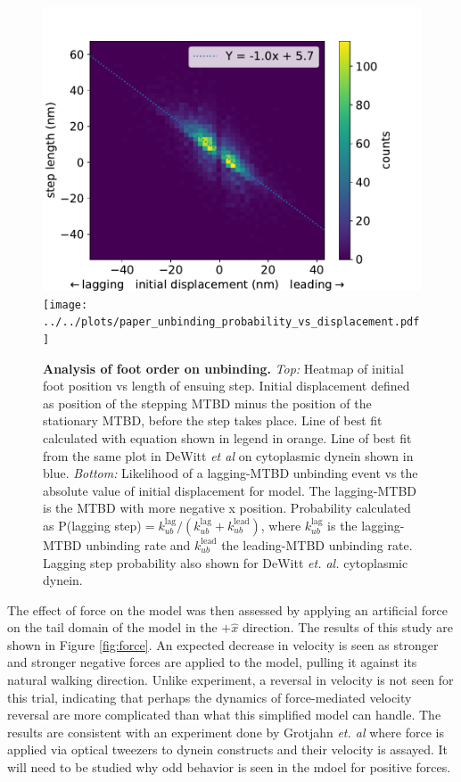 \documentclass[9pt,twocolumn,twoside]{article}
\begin{document}
\begin{figure}[tbhp]
  \includegraphics[width=\linewidth]{../../plots/paper_displacement_vs_step_length.pdf}
  \texttt{[image: ../../plots/paper\_unbinding\_probability\_vs\_displacement.pdf]}
  \caption{\textbf{Analysis of foot order on unbinding.} \textit{Top: } Heatmap of initial foot position vs length of ensuing step. Initial displacement defined as position of the stepping MTBD minus the position of the stationary MTBD, before the step takes place. Line of best fit calculated with equation shown in legend in orange. Line of best fit from the same plot in DeWitt \textit{et al} \cite{yildizpaper} on cytoplasmic dynein shown in blue. \textit{Bottom: } Likelihood of a lagging-MTBD unbinding event vs the absolute value of initial displacement for model. The lagging-MTBD is the MTBD with more negative x position. Probability calculated as P(lagging step)$ = k_{ub}^{\text{lag}} / \left(k_{ub}^{\text{lag}} + k_{ub}^{\text{lead}}\right)$, where $k_{ub}^{\text{lag}}$ is the lagging-MTBD unbinding rate and $k_{ub}^{\text{lead}}$ the leading-MTBD unbinding rate. Lagging step probability also shown for DeWitt \textit{et. al.} cytoplasmic dynein.}
  \label{fig:tensiongating}
\end{figure}

The effect of force on the model was then assessed by applying an artificial force on the tail domain of the model in the $+\hat{x}$ direction. The results of this study are shown in Figure \ref{fig:force}. An expected decrease in velocity is seen as stronger and stronger negative forces are applied to the model, pulling it against its natural walking direction. Unlike experiment, a reversal in velocity is not seen for this trial, indicating that perhaps the dynamics of force-mediated velocity reversal are more complicated than what this simplified model can handle. The results are consistent with an experiment done by Grotjahn \textit{et. al} where force is applied via optical tweezers to dynein constructs and their velocity is assayed. It will need to be studied why odd behavior is seen in the mdoel for positive forces.
\end{document}
